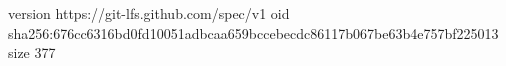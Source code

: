 version https://git-lfs.github.com/spec/v1
oid sha256:676cc6316bd0fd10051adbcaa659bccebecdc86117b067be63b4e757bf225013
size 377
